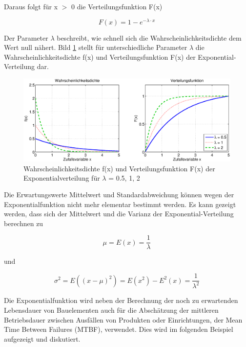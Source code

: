 \noindent Daraus folgt f\"{u}r x $\mathrm{>}$ 0 die Verteilungsfunktion F(x)

\begin{equation}\label{eq:fourhundredsninetysix}
F(x)=1-e^{-\lambda \cdot x}
\end{equation}

\noindent Der Parameter $\lambda$ beschreibt, wie schnell sich die Wahrscheinlichkeitsdichte dem Wert null n\"{a}hert. Bild \ref{fig:Stetig_Exponential} stellt f\"{u}r unterschiedliche Parameter $\lambda$ die Wahrscheinlichkeitsdichte f(x) und Verteilungsfunktion F(x) der Exponential-Verteilung dar.

\begin{figure}[H]
  \centerline{\includegraphics[width=1\textwidth]{Kapitel4/Bilder/image30}}
  \caption{Wahrscheinlichkeitsdichte f(x) und Verteilungsfunktion F(x) der Exponentialverteilung f\"{u}r $\lambda$ = 0.5, 1, 2}
  \label{fig:Stetig_Exponential}
\end{figure}

\noindent Die Erwartungswerte Mittelwert und Standardabweichung k\"{o}nnen wegen der Exponentialfunktion nicht mehr elementar bestimmt werden. Es kann gezeigt werden, dass sich der Mittelwert und die Varianz der Exponential-Verteilung berechnen zu

\begin{equation}\label{eq:fourhundredsninetyseven}
\mu =E(x)=\dfrac{1}{\lambda }
\end{equation}

\noindent und 

\begin{equation}\label{eq:fourhundredsninetyeight}
\sigma _{}^{2} =E\left(\left(x-\mu \right)^{2} \right)=E\left(x^{2} \right)-E^{2} (x)=\dfrac{1}{\lambda ^{2} }
\end{equation}

\noindent Die Exponentialfunktion wird neben der Berechnung der noch zu erwartenden Lebensdauer von Bauelementen auch f\"{u}r die Absch\"{a}tzung der mittleren Betriebsdauer zwischen Ausf\"{a}llen von Produkten oder Einrichtungen, der Mean Time Between Failures (MTBF), verwendet. Dies wird im folgenden Beispiel aufgezeigt und diskutiert.\bigskip

